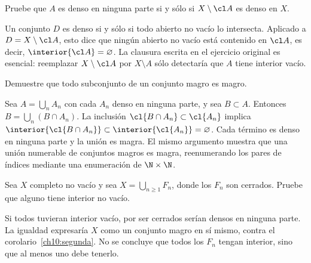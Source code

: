 \begin{ejercicio}
Pruebe que $A$ es denso en ninguna parte si y sólo si $X\setminus\cl A$ es denso en $X$.
\end{ejercicio}
\begin{solucion}
Un conjunto $D$ es denso si y sólo si todo abierto no vacío lo intersecta. Aplicado a $D=X\setminus\cl A$, esto dice que ningún abierto no vacío está contenido en $\cl A$, es decir, $\interior{\cl A}=\varnothing$. La clausura escrita en el ejercicio original es esencial: reemplazar $X\setminus\cl A$ por $X\setminus A$ sólo detectaría que $A$ tiene interior vacío.
\end{solucion}

\begin{ejercicio}
Demuestre que todo subconjunto de un conjunto magro es magro.
\end{ejercicio}
\begin{solucion}
Sea $A=\bigcup_nA_n$ con cada $A_n$ denso en ninguna parte, y sea $B\subset A$. Entonces $B=\bigcup_n(B\cap A_n)$. La inclusión $\cl{B\cap A_n}\subset\cl{A_n}$ implica $\interior{\cl{B\cap A_n}}\subset\interior{\cl{A_n}}=\varnothing$. Cada término es denso en ninguna parte y la unión es magra. El mismo argumento muestra que una unión numerable de conjuntos magros es magra, reenumerando los pares de índices mediante una enumeración de $\N\times\N$.
\end{solucion}

\begin{ejercicio}
Sea $X$ completo no vacío y sea $X=\bigcup_{n\geq1}F_n$, donde los $F_n$ son cerrados. Pruebe que alguno tiene interior no vacío.
\end{ejercicio}
\begin{solucion}
Si todos tuvieran interior vacío, por ser cerrados serían densos en ninguna parte. La igualdad expresaría $X$ como un conjunto magro en sí mismo, contra el corolario~\ref{ch10:segunda}. No se concluye que todos los $F_n$ tengan interior, sino que al menos uno debe tenerlo.
\end{solucion}

